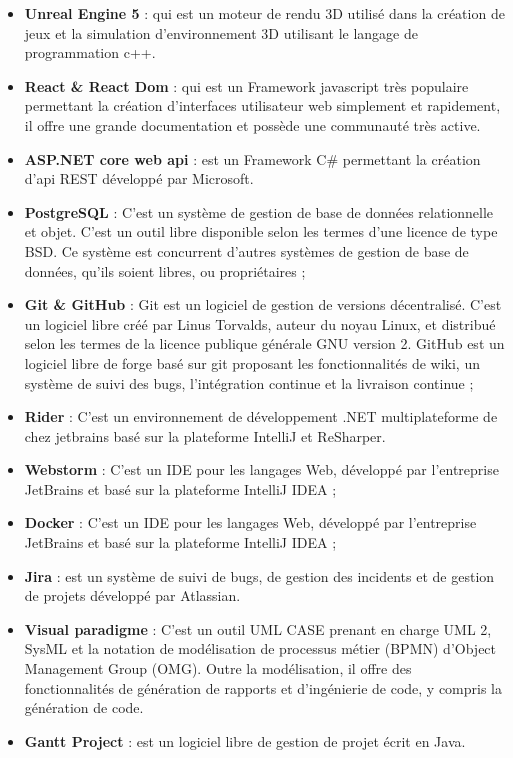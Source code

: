 \begin{itemize}
	\item \textbf{Unreal Engine 5} : qui est un moteur de rendu 3D utilisé dans la création de jeux et la simulation d'environnement 3D utilisant le langage de programmation c++.
	\item \textbf{React \& React Dom} : qui est un Framework javascript très populaire permettant la création d’interfaces utilisateur web simplement et rapidement, il offre une grande documentation et possède une communauté très active.
	\item \textbf{ASP.NET core web api} : est un Framework C\# permettant la création d’api REST développé par Microsoft.
	\item \textbf{PostgreSQL} : C’est un système de gestion de base de données relationnelle et objet. C'est un outil libre disponible selon les termes d'une licence de type BSD. Ce système est concurrent d'autres systèmes de gestion de base de données, qu'ils soient libres, ou propriétaires ;
	\item \textbf{Git \& GitHub} : Git est un logiciel de gestion de versions décentralisé. C'est un logiciel libre créé par Linus Torvalds, auteur du noyau Linux, et distribué selon les termes de la licence publique générale GNU version 2. GitHub est un logiciel libre de forge basé sur git proposant les fonctionnalités de wiki, un système de suivi des bugs, l’intégration continue et la livraison continue ;
	\item \textbf{Rider} : C’est un environnement de développement .NET multiplateforme de chez jetbrains basé sur la plateforme IntelliJ et ReSharper.
	\item \textbf{Webstorm} : C’est un IDE pour les langages Web, développé par l'entreprise JetBrains et basé sur la plateforme IntelliJ IDEA ;
	\item \textbf{Docker} : C’est un IDE pour les langages Web, développé par l'entreprise JetBrains et basé sur la plateforme IntelliJ IDEA ;
	\item \textbf{Jira} : est un système de suivi de bugs, de gestion des incidents et de gestion de projets développé par Atlassian.
	\item \textbf{Visual paradigme} : C’est un outil UML CASE prenant en charge UML 2, SysML et la notation de modélisation de processus métier (BPMN) d’Object Management Group (OMG). Outre la modélisation, il offre des fonctionnalités de génération de rapports et d’ingénierie de code, y compris la génération de code.
	\item \textbf{Gantt Project} : est un logiciel libre de gestion de projet écrit en Java.
\end{itemize}

